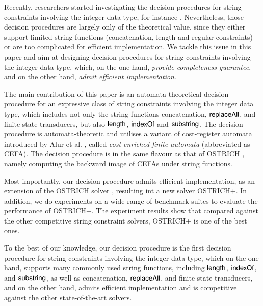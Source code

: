 Recently, researchers started investigating the decision procedures for string constraints involving the integer data type, for instance \cite{Vijay-length,L16,LinM18,LB16}. Nevertheless, those decision procedures are largely only of the theoretical value, since they either support limited string functions (concatenation, length and regular constraints) or are too complicated for efficient implementation. We tackle this issue in this paper and aim at designing decision procedures for string constraints involving the integer data type, which, on the one hand, \emph{provide completeness guarantee}, and on the other hand, \emph{admit efficient implementation}.

The main contribution of this paper is an automata-theoretical decision procedure for an expressive class of string constraints involving the integer data type, which includes not only the string functions concatenation, $\mathsf{replaceAll}$, and finite-state transducers, but also $\mathsf{length}$, $\mathsf{indexOf}$ and $\mathsf{substring}$. The decision procedure is automata-theoretic and utilises a variant of cost-register automata introduced by Alur et al. \cite{RLJ+13}, called \emph{cost-enriched finite automata} (abbreviated as CEFA). The decision procedure is in the same flavour as that of OSTRICH \cite{CHL+19}, namely computing the backward image of CEFAs under string functions. 

Most importantly, our decision procedure admits efficient implementation, as an extension of the OSTRICH solver \cite{CHL+19}, resulting int a new solver OSTRICH+.  In addition, we do experiments on a wide range of benchmark suites to evaluate the performance of OSTRICH+. The experiment results show that compared against the other competitive string constraint solvers, OSTRICH+ is one of the best ones. 

To the best of our knowledge, our decision procedure is the first decision procedure for string constraints involving the integer data type, which on the one hand, supports many commonly used string functions, including $\mathsf{length}$, $\mathsf{indexOf}$, and $\mathsf{substring}$,  as well as concatenation, $\mathsf{replaceAll}$, and finite-state transducers, and on the other hand, admits efficient implementation and is competitive against the other state-of-the-art solvers.



